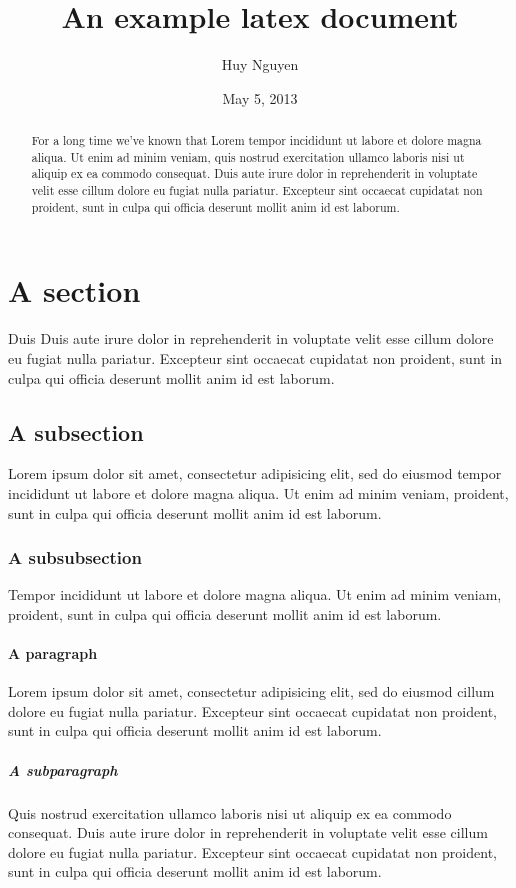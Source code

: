 \documentclass[10pt]{article}
\title{An example latex document}
\author{Huy Nguyen}
\date{May 5, 2013}
\begin{document}
\maketitle

\tableofcontents


\begin{abstract}
For a long time we've known that Lorem 
tempor incididunt ut labore et dolore magna aliqua. Ut enim ad minim veniam,
quis nostrud exercitation ullamco laboris nisi ut aliquip ex ea commodo
consequat. Duis aute irure dolor in reprehenderit in voluptate velit esse
cillum dolore eu fugiat nulla pariatur. Excepteur sint occaecat cupidatat non
proident, sunt in culpa qui officia deserunt mollit anim id est laborum.
\end{abstract}

\section{A section}
Duis Duis aute irure dolor in reprehenderit in voluptate velit esse
cillum dolore eu fugiat nulla pariatur. Excepteur sint occaecat cupidatat non
proident, sunt in culpa qui officia deserunt mollit anim id est laborum.

\subsection{A subsection}
Lorem ipsum dolor sit amet, consectetur adipisicing elit, sed do eiusmod
tempor incididunt ut labore et dolore magna aliqua. Ut enim ad minim veniam,
proident, sunt in culpa qui officia deserunt mollit anim id est laborum.

\subsubsection{A subsubsection}
Tempor incididunt ut labore et dolore magna aliqua. Ut enim ad minim veniam,
proident, sunt in culpa qui officia deserunt mollit anim id est laborum.

\paragraph{A paragraph}
Lorem ipsum dolor sit amet, consectetur adipisicing elit, sed do eiusmod
cillum dolore eu fugiat nulla pariatur. Excepteur sint occaecat cupidatat non
proident, sunt in culpa qui officia deserunt mollit anim id est laborum.

\subparagraph{A subparagraph}
Quis nostrud exercitation ullamco laboris nisi ut aliquip ex ea commodo
consequat. Duis aute irure dolor in reprehenderit in voluptate velit esse
cillum dolore eu fugiat nulla pariatur. Excepteur sint occaecat cupidatat non
proident, sunt in culpa qui officia deserunt mollit anim id est laborum.
\end{document}
